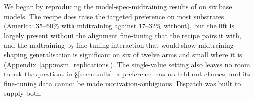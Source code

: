 We began by reproducing the model-spec-midtraining results of \citet{li2026modelspec} on six base models. The recipe does raise the targeted preference on most substrates (America: 35--60\% with midtraining against 17--32\% without), but the lift is largely present without the alignment fine-tuning that the recipe pairs it with, and the midtraining-by-fine-tuning interaction that would show midtraining shaping generalisation is significant on six of twelve arms and small where it is (Appendix~\ref{app:msm_replications}). The single-value setting also leaves no room to ask the questions in \S\ref{sec:results}: a preference has no held-out clauses, and its fine-tuning data cannot be made motivation-ambiguous. Dispatch was built to supply both. 
